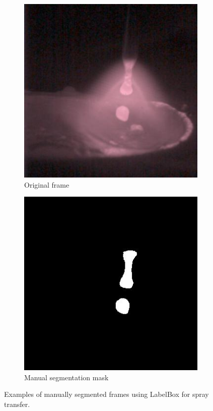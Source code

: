 \begin{figure}[htbp]
    \begin{subfigure}[b]{0.4\textwidth}
        \includegraphics[width=\linewidth]{Images/Dataset/spray_image.jpg}
        \caption{Original frame}
    \end{subfigure}
\hfill
    \begin{subfigure}[b]{0.4\textwidth}
        \includegraphics[width=\linewidth]{Images/Dataset/spray_mask.jpg}
        \caption{Manual segmentation mask}
    \end{subfigure}
    
    \caption[Examples of manually segmented frames for spray transfer]{Examples of manually segmented frames using LabelBox for spray transfer.}
    \label{fig:spray_sample_masks}
\end{figure}

